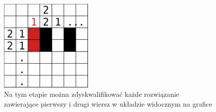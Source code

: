 \begin{figure}[h]
    \centering
    \includegraphics[width=0.4\textwidth]{images/partial_check_example.png}
    \caption{Na tym etapie można zdyskwalifikować każde rozwiązanie zawierające pierwszy i drugi wiersz
w układzie widocznym na grafice}
\end{figure}


\clearpage
